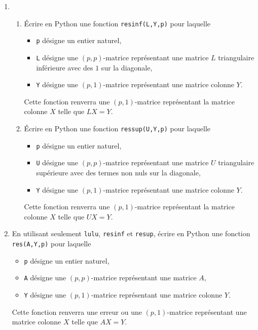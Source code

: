\begin{enumerate}
    \item 
\begin{enumerate}
  \item \'Ecrire en Python une fonction \texttt{resinf(L,Y,p)} pour laquelle
\begin{itemize}
  \item \texttt{p} désigne un entier naturel,
  \item \texttt{L} désigne une $(p,p)$-matrice représentant une matrice $L$ triangulaire inférieure avec des $1$ sur la diagonale,
  \item \texttt{Y} désigne une $(p,1)$-matrice représentant une matrice colonne $Y$.
\end{itemize}
Cette fonction renverra une $(p,1)$-matrice représentant la matrice colonne $X$ telle que $LX = Y$.
  \item \'Ecrire en Python une fonction \texttt{ressup(U,Y,p)} pour laquelle
\begin{itemize}
  \item \texttt{p} désigne un entier naturel,
  \item \texttt{U} désigne une $(p,p)$-matrice représentant une matrice $U$ triangulaire supérieure avec des termes non nuls sur la diagonale,
  \item \texttt{Y} désigne une $(p,1)$-matrice représentant une matrice colonne $Y$.
\end{itemize}
Cette fonction renverra une $(p,1)$-matrice représentant la matrice colonne $X$ telle que $UX = Y$.
\end{enumerate}
  \item En utilisant seulement \texttt{lulu}, \texttt{resinf} et \texttt{resup}, écrire en Python une fonction \texttt{res(A,Y,p)} pour laquelle
\begin{itemize}
  \item \texttt{p} désigne un entier naturel,
  \item \texttt{A} désigne une $(p,p)$-matrice représentant une matrice $A$,
  \item \texttt{Y} désigne une $(p,1)$-matrice représentant une matrice colonne $Y$.
\end{itemize}
Cette fonction renverra une erreur ou une $(p,1)$-matrice représentant une matrice colonne $X$ telle que $AX = Y$.
\end{enumerate}
